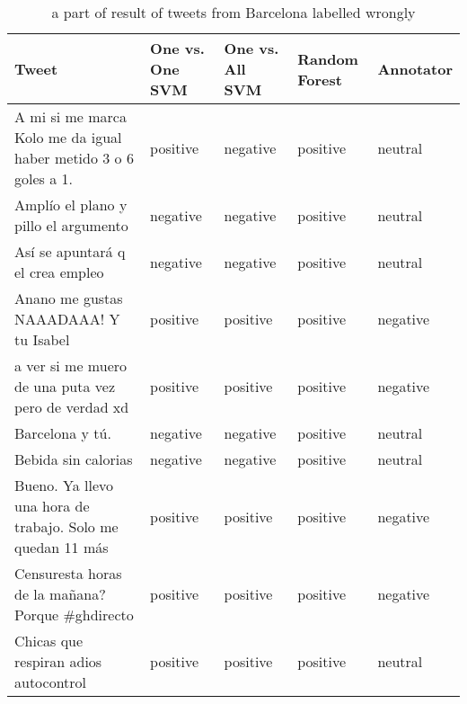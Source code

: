 \begin{table}[ht]
	\caption{a part of result of tweets from Barcelona labelled wrongly}
	\begin{tabular}{|p{5cm}|p{1.8cm}|p{1.8cm}|p{1.8cm}|p{1.8cm}|} \hline
	Tweet & One vs. One SVM &One vs. All SVM &Random Forest & Annotator\\ \hline

	A mi si me marca Kolo me da igual haber metido 3 o 6 goles a 1.&positive &negative &positive &neutral \\ \hline
	Ampl\'io el plano y pillo el argumento &negative &negative &positive & neutral \\ \hline
	As\'i se apuntar\'a q el crea empleo&negative&negative &positive&neutral \\ \hline
	Anano me gustas NAAADAAA! Y tu Isabel&positive&positive&positive&negative\\ \hline
	a ver si me muero de una puta vez pero de verdad xd&positive&positive&positive&negative\\ \hline
	
	Barcelona y t\'u.&negative&negative&positive&neutral\\ \hline
	Bebida sin calorias&negative&negative&positive&neutral\\ \hline 
	Bueno. Ya llevo una hora de trabajo. Solo me quedan 11 más &positive&positive&positive &negative \\ \hline
	Censuresta horas de la ma\~nana? Porque \#ghdirecto&positive&positive&positive &negative \\ \hline
	Chicas que respiran adios autocontrol&positive&positive&positive&neutral\\ \hline
	\end{tabular}
	\label{tab:wrong_tweets_es}
\end{table}

\clearpage



